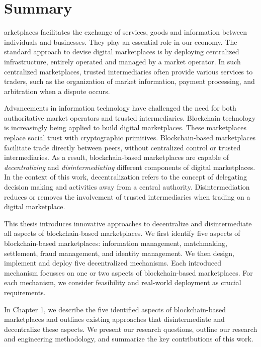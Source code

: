 \chapter*{Summary}

arketplaces facilitates the exchange of services, goods and information between individuals and businesses.
They play an essential role in our economy.
The standard approach to devise digital marketplaces is by deploying centralized infrastructure, entirely operated and managed by a market operator.
In such centralized marketplaces, trusted intermediaries often provide various services to traders, such as the organization of market information, payment processing, and arbitration when a dispute occurs.

Advancements in information technology have challenged the need for both authoritative market operators and trusted intermediaries.
Blockchain technology is increasingly being applied to build digital marketplaces.
These marketplaces replace social trust with cryptographic primitives.
Blockchain-based marketplaces facilitate trade directly between peers, without centralized control or trusted intermediaries.
As a result, blockchain-based marketplaces are capable of \emph{decentralizing} and \emph{disintermediating} different components of digital marketplaces.
In the context of this work, decentralization refers to the concept of delegating decision making and activities away from a central authority.
Disintermediation reduces or removes the involvement of trusted intermediaries when trading on a digital marketplace.

This thesis introduces innovative approaches to decentralize and disintermediate all aspects of blockchain-based marketplaces.
We first identify five aspects of blockchain-based marketplaces: information management, matchmaking, settlement, fraud management, and identity management.
We then design, implement and deploy five decentralized mechanisms.
Each introduced mechanism focusses on one or two aspects of blockchain-based marketplaces.
For each mechanism, we consider feasibility and real-world deployment as crucial requirements.

In Chapter 1, we describe the five identified aspects of blockchain-based marketplaces and outlines existing approaches that disintermediate and decentralize these aspects.
We present our research questions, outline our research and engineering methodology, and summarize the key contributions of this work.

